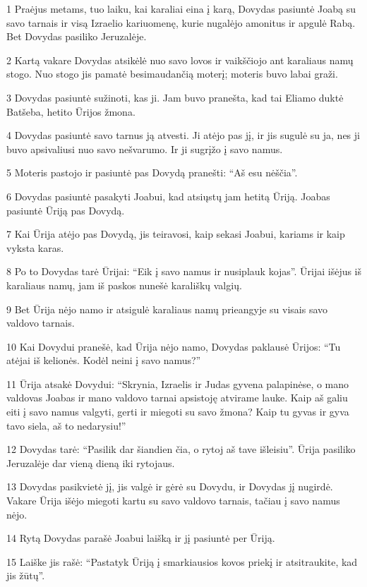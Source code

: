 \par 1 Praėjus metams, tuo laiku, kai karaliai eina į karą, Dovydas pasiuntė Joabą su savo tarnais ir visą Izraelio kariuomenę, kurie nugalėjo amonitus ir apgulė Rabą. Bet Dovydas pasiliko Jeruzalėje. 
\par 2 Kartą vakare Dovydas atsikėlė nuo savo lovos ir vaikščiojo ant karaliaus namų stogo. Nuo stogo jis pamatė besimaudančią moterį; moteris buvo labai graži. 
\par 3 Dovydas pasiuntė sužinoti, kas ji. Jam buvo pranešta, kad tai Eliamo duktė Batšeba, hetito Ūrijos žmona. 
\par 4 Dovydas pasiuntė savo tarnus ją atvesti. Ji atėjo pas jį, ir jis sugulė su ja, nes ji buvo apsivaliusi nuo savo nešvarumo. Ir ji sugrįžo į savo namus. 
\par 5 Moteris pastojo ir pasiuntė pas Dovydą pranešti: “Aš esu nėščia”. 
\par 6 Dovydas pasiuntė pasakyti Joabui, kad atsiųstų jam hetitą Ūriją. Joabas pasiuntė Ūriją pas Dovydą. 
\par 7 Kai Ūrija atėjo pas Dovydą, jis teiravosi, kaip sekasi Joabui, kariams ir kaip vyksta karas. 
\par 8 Po to Dovydas tarė Ūrijai: “Eik į savo namus ir nusiplauk kojas”. Ūrijai išėjus iš karaliaus namų, jam iš paskos nunešė karališkų valgių. 
\par 9 Bet Ūrija nėjo namo ir atsigulė karaliaus namų prieangyje su visais savo valdovo tarnais. 
\par 10 Kai Dovydui pranešė, kad Ūrija nėjo namo, Dovydas paklausė Ūrijos: “Tu atėjai iš kelionės. Kodėl neini į savo namus?” 
\par 11 Ūrija atsakė Dovydui: “Skrynia, Izraelis ir Judas gyvena palapinėse, o mano valdovas Joabas ir mano valdovo tarnai apsistoję atvirame lauke. Kaip aš galiu eiti į savo namus valgyti, gerti ir miegoti su savo žmona? Kaip tu gyvas ir gyva tavo siela, aš to nedarysiu!” 
\par 12 Dovydas tarė: “Pasilik dar šiandien čia, o rytoj aš tave išleisiu”. Ūrija pasiliko Jeruzalėje dar vieną dieną iki rytojaus. 
\par 13 Dovydas pasikvietė jį, jis valgė ir gėrė su Dovydu, ir Dovydas jį nugirdė. Vakare Ūrija išėjo miegoti kartu su savo valdovo tarnais, tačiau į savo namus nėjo. 
\par 14 Rytą Dovydas parašė Joabui laišką ir jį pasiuntė per Ūriją. 
\par 15 Laiške jis rašė: “Pastatyk Ūriją į smarkiausios kovos priekį ir atsitraukite, kad jis žūtų”. 
